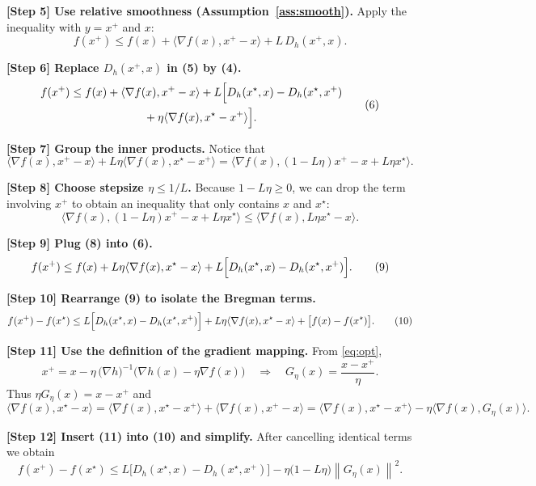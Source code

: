 \documentclass{article}
\newcommand{\norm}[1]{\left\lVert#1\right\rVert}
\newcommand{\inner}[2]{\langle #1,#2\rangle}
\begin{document}
\noindent\textbf{[Step 5] Use relative smoothness (Assumption~\ref{ass:smooth}).}  
Apply the inequality with $y=x^{+}$ and $x$:
\[
f(x^{+})\le f(x)+\inner{\nabla f(x)}{x^{+}-x}+L\,D_{h}(x^{+},x).
\tag{5}
\]

\noindent\textbf{[Step 6] Replace $D_{h}(x^{+},x)$ in (5) by (4).}  
\[
\begin{aligned}
f(x^{+})
&\le f(x)+\inner{\nabla f(x)}{x^{+}-x}
   +L\Bigl[ D_{h}(x^{\star},x)-D_{h}(x^{\star},x^{+})\\
&\qquad\qquad\qquad\;\;+\eta\inner{\nabla f(x)}{x^{\star}-x^{+}}\Bigr].
\end{aligned}
\tag{6}
\]

\noindent\textbf{[Step 7] Group the inner products.}  
Notice that
\[
\inner{\nabla f(x)}{x^{+}-x}
    +L\eta\inner{\nabla f(x)}{x^{\star}-x^{+}}
= \inner{\nabla f(x)}{(1-L\eta)x^{+} -x +L\eta x^{\star}}.
\tag{7}
\]

\noindent\textbf{[Step 8] Choose stepsize $\eta\le 1/L$.}  
Because $1-L\eta\ge 0$, we can drop the term involving $x^{+}$ to obtain an inequality that only contains $x$ and $x^{\star}$:
\[
\inner{\nabla f(x)}{(1-L\eta)x^{+} -x +L\eta x^{\star}}
\le \inner{\nabla f(x)}{L\eta x^{\star}-x}.
\tag{8}
\]

\noindent\textbf{[Step 9] Plug (8) into (6).}  
\[
f(x^{+})\le f(x)+L\eta\inner{\nabla f(x)}{x^{\star}-x}
   +L\Bigl[ D_{h}(x^{\star},x)-D_{h}(x^{\star},x^{+})\Bigr].
\tag{9}
\]

\noindent\textbf{[Step 10] Rearrange (9) to isolate the Bregman terms.}  
\[
f(x^{+})-f(x^{\star})
\le L\Bigl[ D_{h}(x^{\star},x)-D_{h}(x^{\star},x^{+})\Bigr]
      +L\eta\inner{\nabla f(x)}{x^{\star}-x}
      +\bigl[f(x)-f(x^{\star})\bigr].
\tag{10}
\]

\noindent\textbf{[Step 11] Use the definition of the gradient mapping.}  
From \eqref{eq:opt},
\[
x^{+}=x-\eta\,\bigl(\nabla h\big)^{-1}\!\bigl(\nabla h(x)-\eta\nabla f(x)\bigr)
\quad\Longrightarrow\quad
G_{\eta}(x)=\frac{x-x^{+}}{\eta}.
\]
Thus $\eta G_{\eta}(x)=x-x^{+}$ and
\[
\inner{\nabla f(x)}{x^{\star}-x}
= \inner{\nabla f(x)}{x^{\star}-x^{+}}+\inner{\nabla f(x)}{x^{+}-x}
= \inner{\nabla f(x)}{x^{\star}-x^{+}}-\eta\inner{\nabla f(x)}{G_{\eta}(x)}.
\tag{11}
\]

\noindent\textbf{[Step 12] Insert (11) into (10) and simplify.}  
After cancelling identical terms we obtain
\[
f(x^{+})-f(x^{\star})
\le L\bigl[ D_{h}(x^{\star},x)-D_{h}(x^{\star},x^{+})\bigr]
    -\eta\bigl(1-L\eta\bigr)\norm{G_{\eta}(x)}^{2}.
\tag{12}
\]
\end{document}
